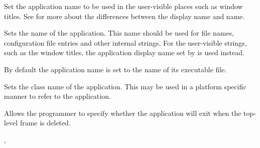 
Set the application name to be used in the user-visible places such as window
titles. See  for more about
the differences between the display name and name.


\label{wxappsetappname}


Sets the name of the application. This name should be used for file names,
configuration file entries and other internal strings. For the user-visible
strings, such as the window titles, the application display name set by 
 is used instead.

By default the application name is set to the name of its executable file.




\label{wxappsetclassname}


Sets the class name of the application. This may be used in a platform specific
manner to refer to the application.




\label{wxappsetexitonframedelete}


Allows the programmer to specify whether the application will exit when the
top-level frame is deleted.




,\\


\label{wxappsetinstance}

